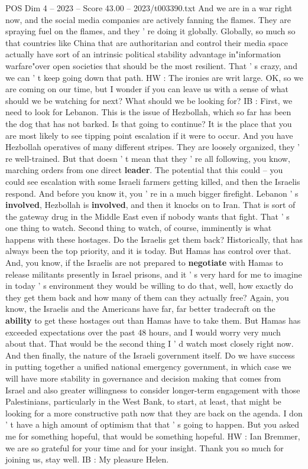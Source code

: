 \begin{textsample}{POS Dim 4 – 2023 – Score 43.00 – 2023/t003390.txt}
And we are in a war right now, and the social media companies are actively fanning the flames.
They are spraying fuel on the flames, and they ' re doing it globally.
Globally, so much so that countries like China that are authoritarian and control their media space actually have sort of an intrinsic political stability advantage in"information warfare"over open societies that should be the most resilient.
That ' s crazy, and we can ' t keep going down that path.
HW : The ironies are writ large.
OK, so we are coming on our time, but I wonder if you can leave us with a sense of what should we be watching for next?
What should we be looking for?
IB : First, we need to look for Lebanon.
This is the issue of Hezbollah, which so far has been the dog that has not barked.
Is that going to continue?
It is the place that you are most likely to see tipping point escalation if it were to occur.
And you have Hezbollah operatives of many different stripes.
They are loosely organized, they ' re well-trained.
But that doesn ' t mean that they ' re all following, you know, marching orders from one direct \textbf{leader}.
The potential that this could -- you could see escalation with some Israeli farmers getting killed, and then the Israelis respond.
And before you know it, you ' re in a much bigger firefight.
Lebanon ' s \textbf{involved}, Hezbollah is \textbf{involved}, and then it knocks on to Iran.
That is sort of the gateway drug in the Middle East even if nobody wants that fight.
That ' s one thing to watch.
Second thing to watch, of course, imminently is what happens with these hostages.
Do the Israelis get them back?
Historically, that has always been the top priority, and it is today.
But Hamas has control over that.
And, you know, if the Israelis are not prepared to \textbf{negotiate} with Hamas to release militants presently in Israel prisons, and it ' s very hard for me to imagine in today ' s environment they would be willing to do that, well, how exactly do they get them back and how many of them can they actually free?
Again, you know, the Israelis and the Americans have far, far better tradecraft on the \textbf{ability} to get these hostages out than Hamas have to take them.
But Hamas has exceeded expectations over the past 48 hours, and I would worry very much about that.
That would be the second thing I ' d watch most closely right now.
And then finally, the nature of the Israeli government itself.
Do we have success in putting together a unified national emergency government, in which case we will have more stability in governance and decision making that comes from Israel and also greater willingness to consider longer-term engagement with those Palestinians, particularly in the West Bank, to start, at least, that might be looking for a more constructive path now that they are back on the agenda.
I don ' t have a high amount of optimism that that ' s going to happen.
But you asked me for something hopeful, that would be something hopeful.
HW : Ian Bremmer, we are so grateful for your time and for your insight.
Thank you so much for joining us, stay well.
IB : My pleasure Helen.


\end{textsample}
